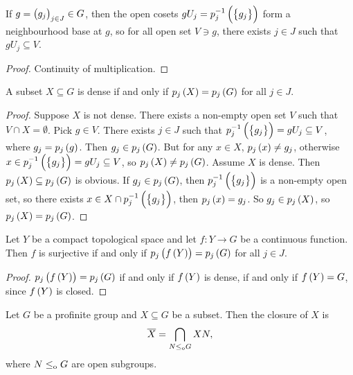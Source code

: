 
\begin{corollary}
If $ g = \br{g_j}_{j \in J} \in G $, then the open cosets $ gU_j = p_j^{-1}\br{\cbr{g_j}} $ form a neighbourhood base at $ g $, so for all open set $ V \ni g $, there exists $ j \in J $ such that $ gU_j \subseteq V $.
\end{corollary}

\begin{proof}
Continuity of multiplication.
\end{proof}

\begin{corollary}
\label{cor:1.2.30}
A subset $ X \subseteq G $ is dense if and only if $ p_j\br{X} = p_j\br{G} $ for all $ j \in J $.
\end{corollary}

\begin{proof}
Suppose $ X $ is not dense. There exists a non-empty open set $ V $ such that $ V \cap X = \emptyset $. Pick $ g \in V $. There exists $ j \in J $ such that $ p_j^{-1}\br{\cbr{g_j}} = gU_j \subseteq V $, where $ g_j = p_j\br{g} $. Then $ g_j \in p_j\br{G} $. But for any $ x \in X $, $ p_j\br{x} \ne g_j $, otherwise $ x \in p_j^{-1}\br{\cbr{g_j}} = gU_j \subseteq V $, so $ p_j\br{X} \ne p_j\br{G} $. Assume $ X $ is dense. Then $ p_j\br{X} \subseteq p_j\br{G} $ is obvious. If $ g_j \in p_j\br{G} $, then $ p_j^{-1}\br{\cbr{g_j}} $ is a non-empty open set, so there exists $ x \in X \cap p_j^{-1}\br{\cbr{g_j}} $, then $ p_j\br{x} = g_j $. So $ g_j \in p_j\br{X} $, so $ p_j\br{X} = p_j\br{G} $.
\end{proof}

\begin{corollary}
\label{cor:1.2.31}
Let $ Y $ be a compact topological space and let $ f : Y \to G $ be a continuous function. Then $ f $ is surjective if and only if $ p_j\br{f\br{Y}} = p_j\br{G} $ for all $ j \in J $.
\end{corollary}

\begin{proof}
$ p_j\br{f\br{Y}} = p_j\br{G} $ if and only if $ f\br{Y} $ is dense, if and only if $ f\br{Y} = G $, since $ f\br{Y} $ is closed.
\end{proof}

\begin{proposition}
\label{prop:1.2.32}
Let $ G $ be a profinite group and $ X \subseteq G $ be a subset. Then the closure of $ X $ is
$$ \overline{X} = \bigcap_{N \le_{\mathrm{o}} G} XN, $$
where $ N \le_{\mathrm{o}} G $ are open subgroups.
\end{proposition}

